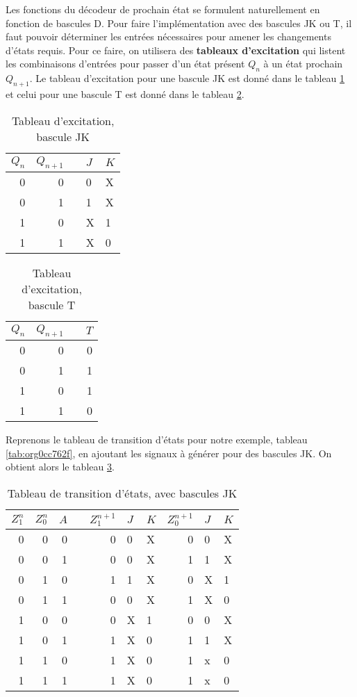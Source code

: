 \documentclass[11pt]{article}
\begin{document}
Les fonctions du décodeur de prochain état se formulent naturellement
en fonction de bascules D.  Pour faire l'implémentation avec des
bascules JK ou T, il faut pouvoir déterminer les entrées nécessaires
pour amener les changements d'états requis. Pour ce faire, on
utilisera des \textbf{tableaux d'excitation} qui listent les combinaisons
d'entrées pour passer d'un état présent \(Q_n\) à un état prochain
\(Q_{n+1}\). Le tableau d'excitation pour une bascule JK est donné
dans le tableau \ref{tab:org95cbf6b} et celui pour une bascule T est donné
dans le tableau \ref{tab:org28d99b6}.

\begin{table}[htbp]
\caption{\label{tab:org95cbf6b}Tableau d'excitation, bascule JK}
\centering
\begin{tabular}{rrlll}
\(Q_n\) & \(Q_{n+1}\) &  & \(J\) & \(K\)\\
\hline
0 & 0 &  & 0 & X\\
0 & 1 &  & 1 & X\\
1 & 0 &  & X & 1\\
1 & 1 &  & X & 0\\
\end{tabular}
\end{table}

\begin{table}[htbp]
\caption{\label{tab:org28d99b6}Tableau d'excitation, bascule T}
\centering
\begin{tabular}{rrlr}
\(Q_n\) & \(Q_{n+1}\) &  & \(T\)\\
\hline
0 & 0 &  & 0\\
0 & 1 &  & 1\\
1 & 0 &  & 1\\
1 & 1 &  & 0\\
\end{tabular}
\end{table}

Reprenons le tableau de transition d'états pour notre exemple, tableau
\ref{tab:org0cc762f}, en ajoutant les signaux à générer pour des
bascules JK. On obtient alors le tableau \ref{tab:org5f588a3}.

\begin{table}[htbp]
\caption{\label{tab:org5f588a3}Tableau de transition d'états, avec bascules JK}
\centering
\begin{tabular}{rrrlrllrll}
\(Z_1^n\) & \(Z_0^n\) & \(A\) &  & \(Z_1^{n+1}\) & \(J\) & \(K\) & \(Z_0^{n+1}\) & \(J\) & \(K\)\\
\hline
0 & 0 & 0 &  & 0 & 0 & X & 0 & 0 & X\\
0 & 0 & 1 &  & 0 & 0 & X & 1 & 1 & X\\
0 & 1 & 0 &  & 1 & 1 & X & 0 & X & 1\\
0 & 1 & 1 &  & 0 & 0 & X & 1 & X & 0\\
1 & 0 & 0 &  & 0 & X & 1 & 0 & 0 & X\\
1 & 0 & 1 &  & 1 & X & 0 & 1 & 1 & X\\
1 & 1 & 0 &  & 1 & X & 0 & 1 & x & 0\\
1 & 1 & 1 &  & 1 & X & 0 & 1 & x & 0\\
\end{tabular}
\end{table}
\end{document}
